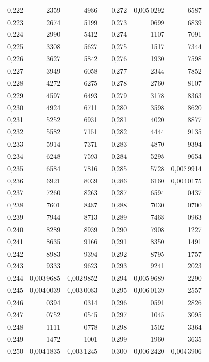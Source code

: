 \begin{tabular}{|r|r|r|@{}p{9pt}@{}|r|r|r|}
0,222 & 2359 & 4986 &  & 0,272 & 0,005\,0292 & 6587 \\
0,223 & 2674 & 5199 &  & 0,273 & 0699 & 6839 \\
0,224 & 2990 & 5412 &  & 0,274 & 1107 & 7091 \\
0,225 & 3308 & 5627 &  & 0,275 & 1517 & 7344 \\[3pt]
0,226 & 3627 & 5842 &  & 0,276 & 1930 & 7598 \\
0,227 & 3949 & 6058 &  & 0,277 & 2344 & 7852 \\
0,228 & 4272 & 6275 &  & 0,278 & 2760 & 8107 \\
0,229 & 4597 & 6493 &  & 0,279 & 3178 & 8363 \\
0,230 & 4924 & 6711 &  & 0,280 & 3598 & 8620 \\[3pt]
0,231 & 5252 & 6931 &  & 0,281 & 4020 & 8877 \\
0,232 & 5582 & 7151 &  & 0,282 & 4444 & 9135 \\
0,233 & 5914 & 7371 &  & 0,283 & 4870 & 9394 \\
0,234 & 6248 & 7593 &  & 0,284 & 5298 & 9654 \\
0,235 & 6584 & 7816 &  & 0,285 & 5728 & 0,003\,9914 \\[3pt]
0,236 & 6921 & 8039 &  & 0,286 & 6160 & 0,004\,0175 \\
0,237 & 7260 & 8263 &  & 0,287 & 6594 & 0437 \\
0,238 & 7601 & 8487 &  & 0,288 & 7030 & 0700 \\
0,239 & 7944 & 8713 &  & 0,289 & 7468 & 0963 \\
0,240 & 8289 & 8939 &  & 0,290 & 7908 & 1227 \\[3pt]
0,241 & 8635 & 9166 &  & 0,291 & 8350 & 1491 \\
0,242 & 8983 & 9394 &  & 0,292 & 8795 & 1757 \\
0,243 & 9333 & 9623 &  & 0,293 & 9241 & 2023 \\
0,244 & 0,003\,9685 & 0,002\,9852 &  & 0,294 & 0,005\,9689 & 2290 \\
0,245 & 0,004\,0039 & 0,003\,0083 &  & 0,295 & 0,006\,0139 & 2557 \\[3pt]
0,246 & 0394 & 0314 &  & 0,296 & 0591 & 2826 \\
0,247 & 0752 & 0545 &  & 0,297 & 1045 & 3095 \\
0,248 & 1111 & 0778 &  & 0,298 & 1502 & 3364 \\
0,249 & 1472 & 1001 &  & 0,299 & 1960 & 3635 \\
0,250 & 0,004\,1835 & 0,003\,1245 &  & 0,300 & 0,006\,2420 & 0,004\,3906 \\
\hline
\end{tabular}\par
\endgroup
